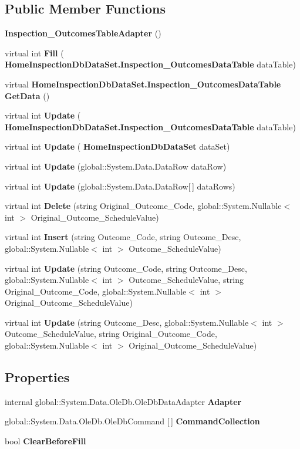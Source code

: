 \subsection*{Public Member Functions}
\begin{DoxyCompactItemize}
\item 
\textbf{ Inspection\+\_\+\+Outcomes\+Table\+Adapter} ()
\item 
virtual int \textbf{ Fill} (\textbf{ Home\+Inspection\+Db\+Data\+Set.\+Inspection\+\_\+\+Outcomes\+Data\+Table} data\+Table)
\item 
virtual \textbf{ Home\+Inspection\+Db\+Data\+Set.\+Inspection\+\_\+\+Outcomes\+Data\+Table} \textbf{ Get\+Data} ()
\item 
virtual int \textbf{ Update} (\textbf{ Home\+Inspection\+Db\+Data\+Set.\+Inspection\+\_\+\+Outcomes\+Data\+Table} data\+Table)
\item 
virtual int \textbf{ Update} (\textbf{ Home\+Inspection\+Db\+Data\+Set} data\+Set)
\item 
virtual int \textbf{ Update} (global\+::\+System.\+Data.\+Data\+Row data\+Row)
\item 
virtual int \textbf{ Update} (global\+::\+System.\+Data.\+Data\+Row[$\,$] data\+Rows)
\item 
virtual int \textbf{ Delete} (string Original\+\_\+\+Outcome\+\_\+\+Code, global\+::\+System.\+Nullable$<$ int $>$ Original\+\_\+\+Outcome\+\_\+\+Schedule\+Value)
\item 
virtual int \textbf{ Insert} (string Outcome\+\_\+\+Code, string Outcome\+\_\+\+Desc, global\+::\+System.\+Nullable$<$ int $>$ Outcome\+\_\+\+Schedule\+Value)
\item 
virtual int \textbf{ Update} (string Outcome\+\_\+\+Code, string Outcome\+\_\+\+Desc, global\+::\+System.\+Nullable$<$ int $>$ Outcome\+\_\+\+Schedule\+Value, string Original\+\_\+\+Outcome\+\_\+\+Code, global\+::\+System.\+Nullable$<$ int $>$ Original\+\_\+\+Outcome\+\_\+\+Schedule\+Value)
\item 
virtual int \textbf{ Update} (string Outcome\+\_\+\+Desc, global\+::\+System.\+Nullable$<$ int $>$ Outcome\+\_\+\+Schedule\+Value, string Original\+\_\+\+Outcome\+\_\+\+Code, global\+::\+System.\+Nullable$<$ int $>$ Original\+\_\+\+Outcome\+\_\+\+Schedule\+Value)
\end{DoxyCompactItemize}
\subsection*{Properties}
\begin{DoxyCompactItemize}
\item 
internal global\+::\+System.\+Data.\+Ole\+Db.\+Ole\+Db\+Data\+Adapter \textbf{ Adapter}\hspace{0.3cm}{\ttfamily  [get]}
\item 
global\+::\+System.\+Data.\+Ole\+Db.\+Ole\+Db\+Command [$\,$] \textbf{ Command\+Collection}\hspace{0.3cm}{\ttfamily  [get]}
\item 
bool \textbf{ Clear\+Before\+Fill}\hspace{0.3cm}{\ttfamily  [get, set]}
\end{DoxyCompactItemize}


